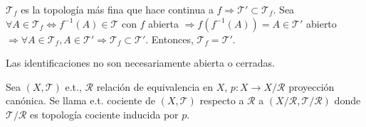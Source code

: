 \begin{dem}
  $\mathcal{T}_{f}$ es la topología más fina que hace continua a $f \Rightarrow \mathcal{T}' \subset \mathcal{T}_{f}$. Sea $\forall A \in \mathcal{T}_{f} \Leftrightarrow f^{-1}(A) \in \mathcal{T}$ con $ f$ abierta $\Rightarrow f(f^{-1}(A)) = A \in \mathcal{T}'$ abierto $\Rightarrow \forall A \in \mathcal{T}_{f}, A \in \mathcal{T}' \Rightarrow \mathcal{T}_{f} \subset \mathcal{T}'$. Entonces, $\mathcal{T}_{f} = \mathcal{T}'$.
\end{dem}

\begin{obs}
  Las identificaciones no son necesariamente abierta o cerradas.
\end{obs}

\begin{defn}
  Sea $ ( X, \mathcal{T} )$ e.t., $\mathcal{R}$ relación de equivalencia en $X$, $p: X \to X / \mathcal{R}$ proyección canónica. Se llama e.t. cociente de $ ( X, \mathcal{T} )$ respecto a $ \mathcal{R}$ a $( X / \mathcal{R}, \mathcal{T} / \mathcal{R} )$ donde $\mathcal{T} / \mathcal{R}$ es topología cociente inducida por $p$.
\end{defn}
